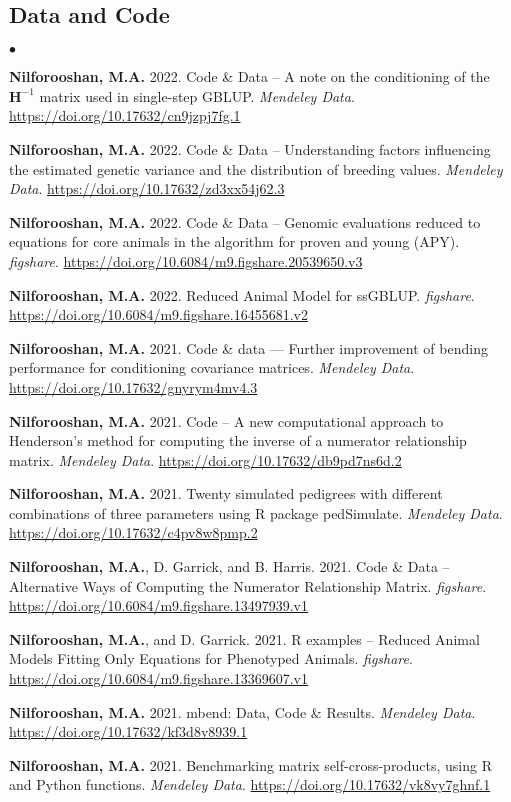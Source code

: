 \documentclass[margin,line]{res}
\newenvironment{list2}{
  \begin{list}{$\bullet$}{%
      \setlength{\itemsep}{0in}
      \setlength{\parsep}{0in} \setlength{\parskip}{0in}
      \setlength{\topsep}{0in} \setlength{\partopsep}{0in}
      \setlength{\leftmargin}{0.2in}}}{\end{list}}
\begin{document}
\begin{resume}
  \section{\sc Data and Code}

  \begin{list2}
    \item {\bf Nilforooshan, M.A.} 2022. Code \& Data -- A note on the conditioning of the $\mathbf H^{-1}$ matrix used in single-step GBLUP. {\em Mendeley Data}. \url{https://doi.org/10.17632/cn9jzpj7fg.1}
    \item {\bf Nilforooshan, M.A.} 2022. Code \& Data -- Understanding factors influencing the estimated genetic variance and the distribution of breeding values. {\em Mendeley Data}. \url{https://doi.org/10.17632/zd3xx54j62.3}
    \item {\bf Nilforooshan, M.A.} 2022. Code \& Data -- Genomic evaluations reduced to equations for core animals in the algorithm for proven and young (APY). {\em figshare}. \url{https://doi.org/10.6084/m9.figshare.20539650.v3}
    \item {\bf Nilforooshan, M.A.} 2022. Reduced Animal Model for ssGBLUP. {\em figshare}. \url{https://doi.org/10.6084/m9.figshare.16455681.v2}
    \item {\bf Nilforooshan, M.A.} 2021. Code \& data --- Further improvement of bending performance for conditioning covariance matrices. {\em Mendeley Data}. \url{https://doi.org/10.17632/gnyrym4mv4.3}
    \item {\bf Nilforooshan, M.A.} 2021. Code -- A new computational approach to Henderson’s method for computing the inverse of a numerator relationship matrix. {\em Mendeley Data}. \url{https://doi.org/10.17632/db9pd7ns6d.2}
    \item {\bf Nilforooshan, M.A.} 2021. Twenty simulated pedigrees with different combinations of three parameters using R package pedSimulate. {\em Mendeley Data}. \url{https://doi.org/10.17632/c4pv8w8pmp.2}
    \item {\bf Nilforooshan, M.A.}, D. Garrick, and B. Harris. 2021. Code \& Data -- Alternative Ways of Computing the Numerator Relationship Matrix. {\em figshare}. \url{https://doi.org/10.6084/m9.figshare.13497939.v1}
    \item {\bf Nilforooshan, M.A.}, and D. Garrick. 2021. R examples -- Reduced Animal Models Fitting Only Equations for Phenotyped Animals. {\em figshare}. \url{https://doi.org/10.6084/m9.figshare.13369607.v1}
    \item {\bf Nilforooshan, M.A.} 2021. mbend: Data, Code \& Results. {\em Mendeley Data}. \url{https://doi.org/10.17632/kf3d8v8939.1}
    \item {\bf Nilforooshan, M.A.} 2021. Benchmarking matrix self-cross-products, using R and Python functions. {\em Mendeley Data}. \url{https://doi.org/10.17632/vk8vy7ghnf.1}
  \end{list2}

\end{resume}
\end{document}
